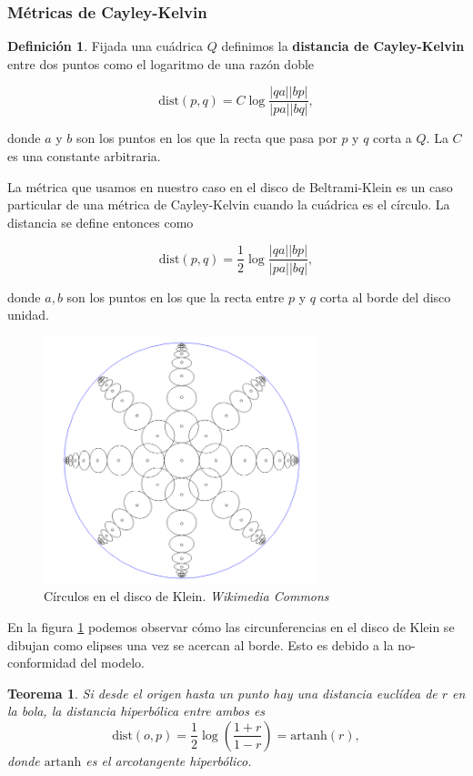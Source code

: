\documentclass{article}
\theoremstyle{plain}
\newtheorem{theorem}{Teorema}
\theoremstyle{definition}
\newtheorem{definition}{Definición}
\theoremstyle{remark}
\begin{document}
\subsubsection{Métricas de Cayley-Kelvin}
\begin{definition}
  Fijada una cuádrica $Q$ definimos la \textbf{distancia de Cayley-Kelvin}
  entre dos puntos como el logaritmo de una razón doble

  \[
    \mathrm{dist}(p,q) = C\log\frac{|qa||bp|}{|pa||bq|},
  \]

  donde $a$ y $b$ son los puntos en los que la recta que pasa por $p$
  y $q$ corta a $Q$. La $C$ es una constante arbitraria.
\end{definition}

La métrica que usamos en nuestro caso en el disco de Beltrami-Klein es
un caso particular de una métrica de Cayley-Kelvin cuando la cuádrica
es el círculo. La distancia se define entonces como

\[
  \mathrm{dist}(p,q) = \frac{1}{2}\log\frac{|qa||bp|}{|pa||bq|},
\]

donde $a,b$ son los puntos en los que la recta entre $p$ y $q$ corta
al borde del disco unidad.

\begin{figure}[ht!]
  \centering
  \includegraphics[width=80mm]{./kleinmodelcircles.png}
  \caption{Círculos en el disco de Klein. \textit{Wikimedia Commons}\label{kleincircles}}
\end{figure}

En la figura \ref{kleincircles} podemos observar cómo las circunferencias
en el disco de Klein se dibujan como elipses una vez se acercan al borde.
Esto es debido a la no-conformidad del modelo.

\begin{theorem}
  Si desde el origen hasta un punto hay una distancia euclídea de $r$
  en la bola, la distancia hiperbólica entre ambos es
  \[
    \mathrm{dist}(o,p) = \frac{1}{2} \log\left(\frac{1+r}{1-r}\right) = \mathrm{artanh}(r),
  \]
  donde $\mathrm{artanh}$ es el arcotangente hiperbólico.
\end{theorem}
\end{document}
